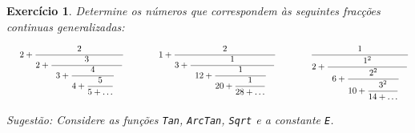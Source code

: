 \documentclass{article}
\newtheorem{ex}{Exercício}[section]
\begin{document}
\begin{ex}
Determine os números que correspondem às seguintes fracções continuas generalizadas:
  
\vspace{-1mm}  

   \[
\hspace{0.5cm}
2+
\displaystyle{ \frac{2 }
{ 2+\displaystyle{\frac{3}{ 
                           {\begin{array}{l}
                              3+\displaystyle{ \frac{4}{4+ \displaystyle \frac{5}{5+\ldots } }  }\,\, 
                           \end{array}
                           }
                           }}}} \qquad \qquad 
                              1+
\displaystyle{ \frac{2 }
{ 3+\displaystyle{\frac{1}{ 
                        {\begin{array}{l}
                              12+\displaystyle{ \frac{1}{20+ \displaystyle \frac{1}{28+\ldots } }  }\,\, 
                             \end{array}
                             }
                             }}}}      \qquad \qquad      
\displaystyle{ \frac{1 }
{ 2+\displaystyle{\frac{1^2}{ 
                          {\begin{array}{l}
                      6+\displaystyle{ \frac{2^2}{10+ \displaystyle \frac{3^2}{14+\ldots } }  }\,\, 
                        \end{array}
                         }
                          }}}}                                                   
\]

Sugestão: Considere as funções \texttt{Tan}, \texttt{ArcTan}, \texttt{Sqrt} e a constante \texttt{E}.
\end{ex}
\end{document}
